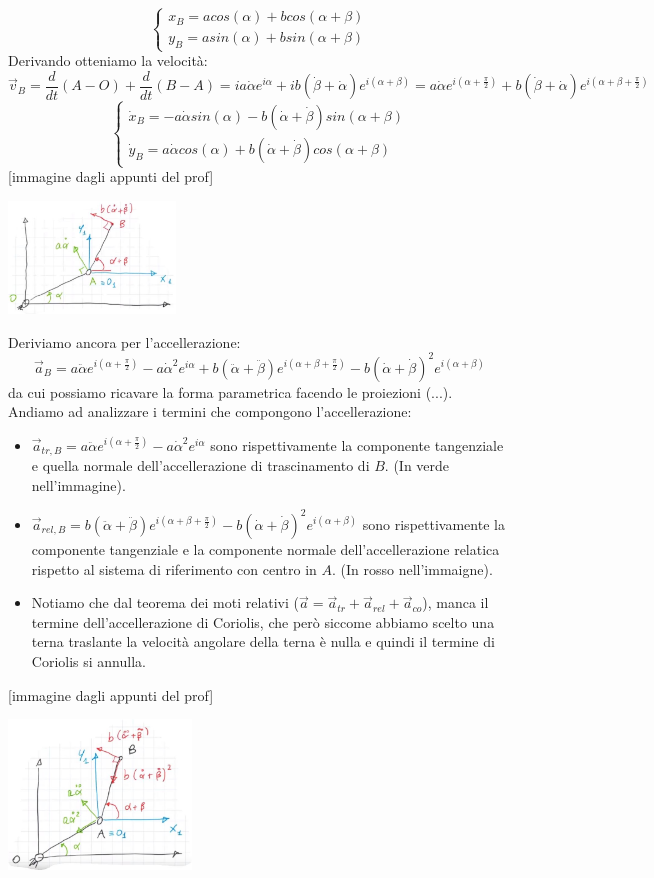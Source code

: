 \[
    \begin{cases}
        x_B = a cos(\alpha) + b cos(\alpha + \beta)\\
        y_B = a sin(\alpha) + b sin(\alpha + \beta)
    \end{cases}
\]
Derivando otteniamo la velocità:
\[
    \vec{v}_B = \frac{d}{dt} (A-O) + \frac{d}{dt} (B-A) = i a \dot{\alpha} e^{i \alpha} + i b (\dot{\beta} + \dot{\alpha}) e^{i(\alpha+\beta)} = a \dot{\alpha} e^{i(\alpha + \frac{\pi}{2})} + b (\dot{\beta} + \dot{\alpha})e^{i(\alpha + \beta + \frac{\pi}{2})}
\]
\[
    \begin{cases}
        \dot{x}_B = -a \dot{\alpha} sin(\alpha) - b (\dot{\alpha} + \dot{\beta})sin(\alpha + \beta)\\
        \dot{y}_B = a \dot{\alpha} cos(\alpha) + b (\dot{\alpha} + \dot{\beta}) cos(\alpha + \beta)
    \end{cases}
\]
[immagine dagli appunti del prof]
\begin{center}
    \includegraphics[height=3cm]{../lezione4/img10.JPG}
\end{center}
Deriviamo ancora per l'accellerazione:
\[
    \vec{a}_B = a \ddot{\alpha} e^{i(\alpha + \frac{\pi}{2})} - a \dot{\alpha}^2 e^{i \alpha} + b (\ddot{\alpha} + \ddot{\beta})e^{i(\alpha + \beta + \frac{\pi}{2})} - b (\dot{\alpha} + \dot{\beta})^2 e^{i(\alpha + \beta)}
\]
da cui possiamo ricavare la forma parametrica facendo le proiezioni (...).\newline
\newline
Andiamo ad analizzare i termini che compongono l'accellerazione:
\begin{itemize}
    \item $\vec{a}_{tr,B} = a \ddot{\alpha} e^{i(\alpha + \frac{\pi}{2})} - a \dot{\alpha}^2 e^{i \alpha}$ sono rispettivamente la componente tangenziale e quella normale dell'accellerazione di trascinamento di $B$. (In verde nell'immagine).
    \item $\vec{a}_{rel,B} = b (\ddot{\alpha} + \ddot{\beta})e^{i(\alpha + \beta + \frac{\pi}{2})} - b (\dot{\alpha} + \dot{\beta})^2 e^{i(\alpha + \beta)}$ sono rispettivamente la componente tangenziale e la componente normale dell'accellerazione relatica rispetto al sistema di riferimento con centro in $A$. (In rosso nell'immaigne).
    \item Notiamo che dal teorema dei moti relativi ($\vec{a} = \vec{a}_{tr} + \vec{a}_{rel} + \vec{a}_{co}$), manca il termine dell'accellerazione di Coriolis, che però siccome abbiamo scelto una terna traslante la velocità angolare della terna è nulla e quindi il termine di Coriolis si annulla.
\end{itemize}
[immagine dagli appunti del prof]
\begin{center}
    \includegraphics[height=4cm]{../lezione4/img11.JPG}
\end{center}